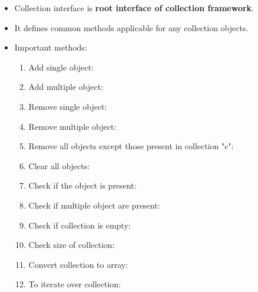 \setlength{\columnsep}{3pt}
\begin{flushleft}
	
	
	\begin{itemize}
		\item Collection interface is \textbf{root interface of collection framework}.
		\item It defines common methods applicable for any collection objects.
		\item Important methods:
		\bigskip
		\begin{enumerate}
			\item Add single object:
			\bigskip
			\item Add multiple object:
			\bigskip
			\item Remove single object:
			\bigskip
			\item Remove multiple object:
			\bigskip
			\item Remove all objects except those present in collection "c":
			\bigskip
			\item Clear all objects:
			\bigskip
			\item Check if the object is present:
			\bigskip
			\item Check if multiple object are present:
			\bigskip
			\item Check if collection is empty:
			\bigskip
			\item Check size of collection:
			\bigskip
			\item Convert collection to array:
			\bigskip
			\item To iterate over collection:
		\end{enumerate}

	\end{itemize}
	
	
\end{flushleft}

\newpage

